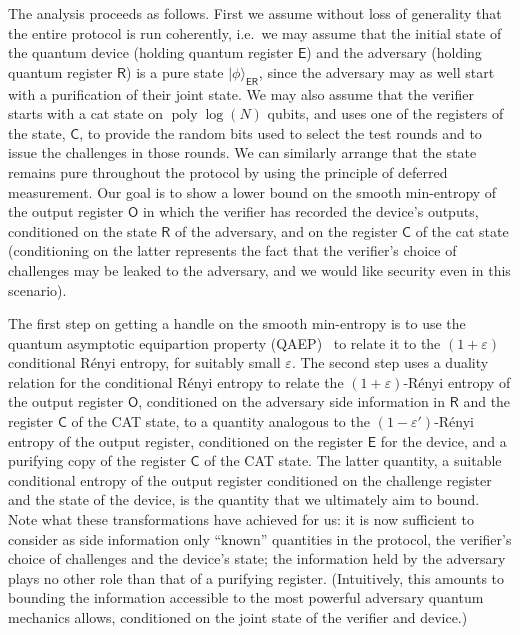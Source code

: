 \documentclass[11pt]{article}
\theoremstyle{remark}
\theoremstyle{definition}
\newcommand{\ket}[1]{|#1\rangle}
\newcommand{\reg}[1]{{\textsf{#1}}}
\DeclareMathOperator{\poly}{poly}
\newcommand{\eps}{\varepsilon}
\begin{document}
The analysis proceeds as follows. First we assume without loss of generality that the entire protocol is run coherently, i.e.\ we may
assume that the initial state of the quantum device (holding quantum register $\reg{E}$) and the adversary (holding quantum register $\reg{R}$)
is a pure state $\ket{\phi}_\reg{ER}$, since the adversary may as well start with a purification of their joint state. We may also assume that the verifier 
starts with a cat state on $\poly\log(N)$ qubits,  and uses one of the registers of the state, $\reg{C}$, to provide the random bits used to select the test rounds and to issue the challenges in those rounds. We can similarly  arrange that 
the state remains pure throughout the protocol by using the principle of deferred measurement. Our goal is to show a lower bound on the smooth
min-entropy of the output register $\reg{O}$ in which the verifier has recorded the device's outputs, conditioned on the state $\reg{R}$ of the adversary, and on the register $\reg{C}$ of the cat state  (conditioning on the latter represents the fact that the verifier's choice of challenges may be leaked to the adversary, and we would like security even in this scenario). 

The first step on getting a handle on the smooth min-entropy is to use the quantum asymptotic equipartion property (QAEP)~\cite{tomamichel2009fully} to relate it to the $(1+\eps)$ conditional R\'enyi entropy, for suitably small $\eps$. The second step uses a duality relation for the conditional R\'enyi entropy to relate the $(1+\eps)$-R\'enyi entropy of the output register $\reg{O}$, conditioned on the adversary side information in $\reg{R}$ and the register $\reg{C}$ of the CAT state,  to a quantity analogous to the $(1-\eps')$-R\'enyi entropy of the output register, conditioned on the register $\reg{E}$ for the device, and a purifying copy of the register $\reg{C}$ of the CAT state. The latter quantity, a suitable conditional entropy of the output register conditioned on the challenge register and the state of the device, is the quantity that we ultimately aim to bound. Note what these transformations have achieved for us: it is now sufficient to consider as side information only ``known'' quantities in the protocol, the verifier's choice of challenges and the device's state; the information held by the adversary plays no other role than that of a purifying register. (Intuitively, this amounts to bounding the information accessible to the most powerful adversary quantum mechanics allows, conditioned on the joint state of the verifier and device.)
\end{document}

